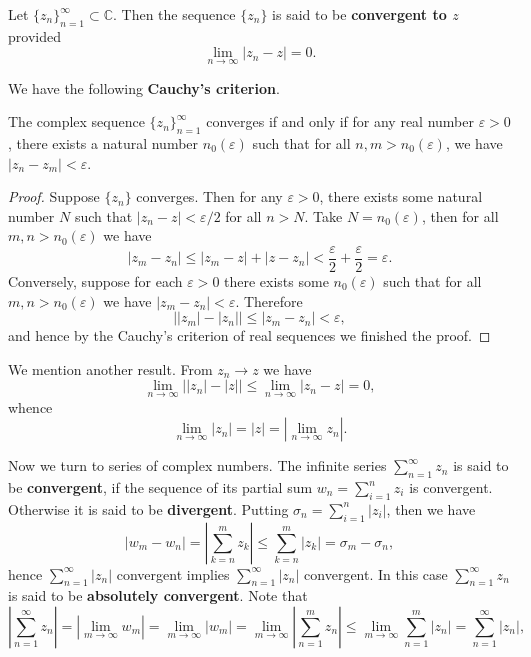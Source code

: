 \begin{definition}
Let $\{z_n\}_{n=1}^\infty\subset\mathbb{C}$. Then the sequence $\{z_n\}$ is said to be \textbf{convergent to $z$} provided 
$$
\lim_{n\to\infty}|z_n-z|=0.
$$
\end{definition}
We have the following \textbf{Cauchy's criterion}.
\begin{theorem}
The complex sequence $\{z_n\}_{n=1}^\infty$ converges if and only if for any real number $\varepsilon>0$, there exists a natural number $n_0(\varepsilon)$ such that for all $n,m>n_0(\varepsilon)$, we have $|z_n-z_m|<\varepsilon$.
\end{theorem}
\begin{proof}
Suppose $\{z_n\}$ converges. Then for any $\varepsilon>0$, there exists some natural number $N$ such that $|z_n-z|<\varepsilon/2$ for all $n>N$. Take $N=n_0(\varepsilon)$, then for all $m,n>n_0(\varepsilon)$ we have 
$$
\left| z_m-z_n \right|\le \left| z_m-z \right|+\left| z-z_n \right|<\frac{\varepsilon}{2}+\frac{\varepsilon}{2}=\varepsilon .
$$
Conversely, suppose for each $\varepsilon>0$ there exists some $n_0(\varepsilon)$ such that for all $m,n>n_0(\varepsilon)$ we have $|z_m-z_n|<\varepsilon$. Therefore 
$$
\left| \left| z_m \right|-\left| z_n \right| \right|\le \left| z_m-z_n \right|<\varepsilon ,
$$
and hence by the Cauchy's criterion of real sequences we finished the proof.
\end{proof}
We mention another result. From $z_n\to z$ we have 
$$
\lim_{n\rightarrow \infty} \left| \left| z_n \right|-\left| z \right| \right|\le \lim_{n\rightarrow \infty} \left| z_n-z \right|=0,
$$
whence 
$$
\lim_{n\rightarrow \infty} \left| z_n \right|=\left| z \right|=\left| \lim_{n\rightarrow \infty} z_n \right|.
$$\par
Now we turn to series of complex numbers. The infinite series $\sum_{n=1}^\infty z_n$ is said to be \textbf{convergent}, if the sequence of its partial sum $w_n=\sum_{i=1}^nz_i$ is convergent. Otherwise it is said to be \textbf{divergent}. Putting $\sigma_n=\sum_{i=1}^n|z_i|$, then we have 
$$
\left| w_m-w_n \right|=\left| \sum_{k=n}^m{z_k} \right|\le \sum_{k=n}^m{\left| z_k \right|}=\sigma _m-\sigma _n,
$$
hence $\sum_{n=1}^\infty|z_n|$ convergent implies $\sum_{n=1}^\infty|z_n|$ convergent. In this case $\sum_{n=1}^\infty z_n$ is said to be \textbf{absolutely convergent}. Note that 
$$
\left| \sum_{n=1}^{\infty}{z_n} \right|=\left| \lim_{m\rightarrow \infty} w_m \right|=\lim_{m\rightarrow \infty} \left| w_m \right|=\lim_{m\rightarrow \infty} \left| \sum_{n=1}^m{z_n} \right|\le \lim_{m\rightarrow \infty} \sum_{n=1}^m{\left| z_n \right|}=\sum_{n=1}^{\infty}{\left| z_n \right|},
$$
